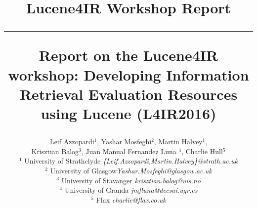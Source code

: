 \documentclass[12pt]{article}
\begin{document}
\title{\vspace{-2.5cm}
\begin{center}
\textbf{\small{Lucene4IR Workshop Report}}\\\vspace{-0.5cm} \rule{17.5cm}{1pt}
\end{center}
\vspace{1cm}\textbf{Report on the Lucene4IR workshop: Developing Information Retrieval Evaluation Resources using Lucene (L4IR2016) }}

\newcommand{\todo}[1]{\textcolor{red}{#1}}
\author{
Leif Azzopardi$^{1}$, Yashar Mosfeghi$^{2}$, Martin Halvey$^{1}$, \\Krisztian Balog$^{3}$, Juan Manual Fernandez Luna $^{4}$, Charlie Hull$^{5}$\\
    $^{1}$ {\small University of Strathclyde  \emph{ \{Leif.Azzopardi,Martin.Halvey\}@strath.ac.uk}}\\
    $^{2}$ {\small University of Glasgow\emph{\small Yashar.Mosfeghi@glasgow.ac.uk}}\\
	$^{3}$ {\small University of Stavanger \emph{\small krisztian.balog@uis.no}}\\
	$^{4}$ {\small University of Granda \emph{\small jmfluna@decsai.ugr.es}}\\
	$^{5}$ {\small Flax \emph{\small charlie@flax.co.uk}}
}
\end{document}
